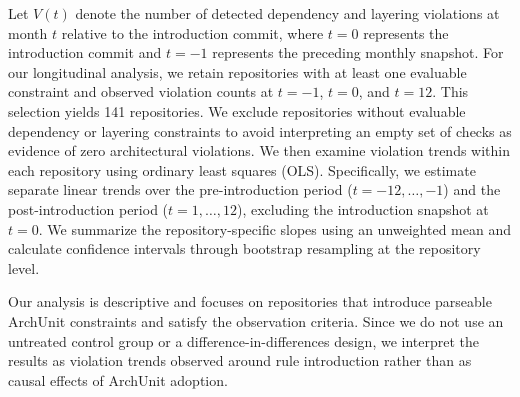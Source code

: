 Let \(V(t)\) denote the number of detected dependency and layering violations at month \(t\) relative to the introduction commit, where \(t=0\) represents the introduction commit and \(t=-1\) represents the preceding monthly snapshot. For our longitudinal analysis, we retain repositories with at least one evaluable constraint and observed violation counts at \(t=-1\), \(t=0\), and \(t=12\). This selection yields 141 repositories. We exclude repositories without evaluable dependency or layering constraints to avoid interpreting an empty set of checks as evidence of zero architectural violations.
We then examine violation trends within each repository using ordinary least squares (OLS). Specifically, we estimate separate linear trends over the pre-introduction period (\(t=-12,\ldots,-1\)) and the post-introduction period (\(t=1,\ldots,12\)), excluding the introduction snapshot at \(t=0\). We summarize the repository-specific slopes using an unweighted mean and calculate confidence intervals through bootstrap resampling at the repository level.

Our analysis is descriptive and focuses on repositories that introduce parseable ArchUnit constraints and satisfy the observation criteria. Since we do not use an untreated control group or a difference-in-differences design, we interpret the results as violation trends observed around rule introduction rather than as causal effects of ArchUnit adoption.